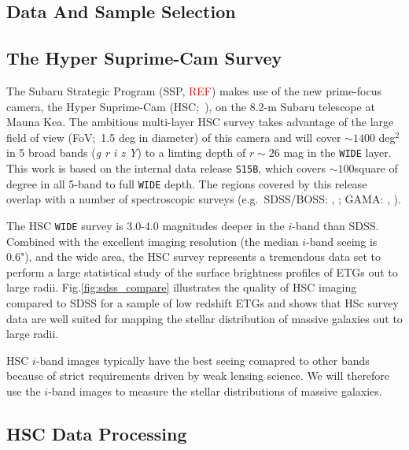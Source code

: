 \documentclass{emulateapj}
\newcommand{\addref}{{\textcolor{red}{REF}}}
\begin{document}
\begin{CJK*}{UTF8}{gbsn}
\section{Data And Sample Selection}
    \label{sec:data}

\subsection{The Hyper Suprime-Cam Survey}
    \label{ssec:hsc}

    The Subaru Strategic Program (SSP, \addref) makes use of the new prime-focus camera,
    the Hyper Suprime-Cam (HSC;~\citealt{Miyazaki2012}), on the 8.2-m Subaru telescope at 
    Mauna Kea. 
    The ambitious multi-layer HSC survey takes advantage of the large field of 
    view (FoV;~1.5 deg in diameter) of this camera and will cover $\sim 1400$ deg$^2$ in 5
    broad bands (\textit{g r i z Y}) to a limting depth of $r \sim 26$ mag in the \texttt{WIDE} layer. 
    This work is based on the internal data release \texttt{S15B}, which covers 
    $\sim 100$square of degree in all 5-band to full \texttt{WIDE} depth.  
    The regions covered by this release overlap with a number of spectroscopic surveys 
    (e.g.\ SDSS/BOSS: \citealt{Eisenstein2011}, \citealt{Alam2015}; 
    GAMA: \citealt{Driver2011}, \citealt{Liske2015}).

   The HSC \texttt{WIDE} survey is $3.0$-$4.0$ magnitudes deeper in the $i$-band 
    than SDSS. 
    Combined with the excellent imaging resolution (the median $i$-band seeing is 0.6"), 
    and the wide area, the HSC survey represents a tremendous data set to perform a 
    large statistical study of the surface brightness profiles of ETGs out to large radii. Fig.\ref{fig:sdss_compare} illustrates the quality of HSC imaging compared to SDSS 
    for a sample of low redshift ETGs and shows that HSc survey data are well 
    suited for mapping the stellar distribution of massive galaxies out to large radii.

	HSC $i$-band images typically have the best seeing comapred to other bands because of 
    strict requirements driven by weak lensing science. 
    We will therefore use the $i$-band images to measure the stellar distributions of 
    massive galaxies. 
    
\subsection{HSC Data Processing}
    \label{sec:pipeline}


\end{CJK*}
\end{document}
